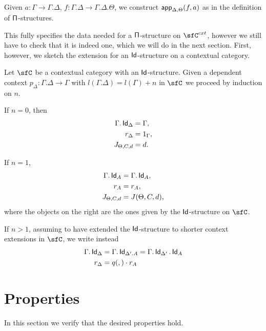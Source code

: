 Given $a\colon\Gamma\rightarrow\Gamma.\Delta$,
$f\colon\Gamma.\Delta\rightarrow\Gamma.\Delta.\Theta$, we construct
$\operatorname{\mathsf{app}}_{\Delta,\Theta}(f,a)$ as in the definition of $\operatorname{\mathsf{\Pi}}$-structures.

This fully specifies the data needed for a $\operatorname{\mathsf{\Pi}}$-structure on $\sfC^{cxt}$,
however we still have to check that it is indeed one, which we will do in the
next section. First, however, we sketch the extension for an $\operatorname{\mathsf{Id}}$-structure on
a contextual category.

\begin{construction}
  Let $\sfC$ be a contextual category with an $\operatorname{\mathsf{Id}}$-structure. Given a dependent
  context $p_\Delta\colon\Gamma.\Delta\rightarrow\Gamma$ with
  $l(\Gamma.\Delta)=l(\Gamma)+n$ in $\sfC$ we proceed by induction on $n$.

  If $n=0$, then
  \begin{align*}
    \Gamma.\operatorname{\mathsf{Id}}_\Delta &=\Gamma, \\
    r_\Delta &=1_\Gamma, \\
    J_{\Theta,C,d} &=d.
  \end{align*}

  If $n=1$,
  \begin{align*}
    \Gamma.\operatorname{\mathsf{Id}}_A &=\Gamma.\operatorname{\mathsf{Id}}_A, \\
    r_A &=r_A, \\
    J_{\Theta,C,d} &=J(\Theta,C,d),
  \end{align*}
  where the objects on the right are the ones given by the $\operatorname{\mathsf{Id}}$-structure on
  $\sfC$.

  If $n>1$, assuming to have extended the $\operatorname{\mathsf{Id}}$-structure to shorter context
  extensions in $\sfC$, we write instead
  \begin{align*}
    \Gamma.\operatorname{\mathsf{Id}}_{\Delta} &=\Gamma.\operatorname{\mathsf{Id}}_{\Delta'.A}=\Gamma.\operatorname{\mathsf{Id}}_{\Delta'}.\operatorname{\mathsf{Id}}_A \\
    r_{\Delta} &= q(,)\cdot r_A
  \end{align*}
\end{construction}


\section{Properties}

In this section we verify that the desired properties hold.

